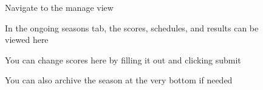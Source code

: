 \documentclass{article}
\begin{document}
\begin{figure}[H]
    \centering
    \caption{Navigate to the manage view}
\end{figure}

\begin{figure}[H]
    \centering
    \caption{In the ongoing seasons tab, the scores, schedules, and results can be viewed here}
\end{figure}

\begin{figure}[H]
    \centering
    \caption{You can change scores here by filling it out and clicking submit}
\end{figure}

\begin{figure}[H]
    \centering
    \caption{You can also archive the season at the very bottom if needed}
\end{figure}
\end{document}
